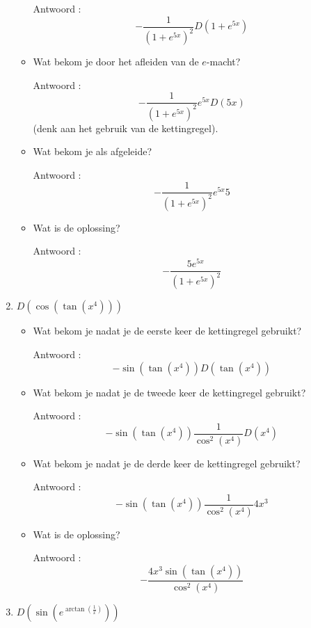\begin{enumerate}
\begin{itemize}
		Antwoord : \[-\frac{1}{\left( 1+e^{5x}  \right)^2}D \left ( 1+e^{5x} \right)\]
		
		\item Wat bekom je door het afleiden van de $e$-macht?
		
		Antwoord : \[-\frac{1}{\left( 1+e^{5x}  \right)^2}e^{5x}D(5x)\] (denk aan het gebruik van de kettingregel).
		
		\item Wat bekom je als afgeleide?
		
		Antwoord : \[-\frac{1}{\left( 1+e^{5x}  \right)^2}e^{5x}5\]
		
		\item Wat is de oplossing?
		
		Antwoord : \[-\frac {5e^{5x}}{\left( 1+e^{5x}  \right)^2}\]
		
	\end{itemize}
	
	\item $D \left( \cos \left( \tan \left(  x^4 \right)  \right)  \right)$
	
	\begin{itemize}
		
		\item Wat bekom je nadat je de eerste keer de kettingregel gebruikt?
		
		Antwoord : \[-\sin \left( \tan \left(  x^4  \right)  \right)D \left( \tan \left( x^4  \right)  \right)\]
		
		\item Wat bekom je nadat je de tweede keer de kettingregel gebruikt?
		
		Antwoord : \[-\sin \left( \tan \left(  x^4  \right)  \right)\frac{1}{\cos^2 \left( x^4  \right)}D\left(  x^4 \right)\]
		
		\item Wat bekom je nadat je de derde keer de kettingregel gebruikt?
		
		Antwoord :  \[-\sin \left( \tan \left(  x^4  \right)  \right)\frac{1}{\cos^2 \left( x^4  \right)}4x^3\]
		
		\item Wat is de oplossing?
		
		Antwoord : \[-\frac{4x^3\sin \left( \tan \left(  x^4  \right)  \right)}{\cos^2 \left( x^4  \right)}\]
		
	\end{itemize}
	
	\item $D \left(  \sin \left(  e^{\arctan \left(  \frac{1}{x}  \right) } \right)  \right)$
	

\end{enumerate}
